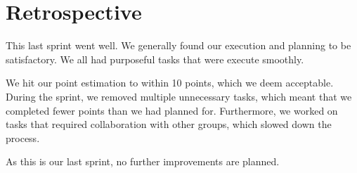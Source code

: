 \section{Retrospective}\label{sec:sprint6retrospective}
This last sprint went well. We generally found our execution and planning to be satisfactory. We all had purposeful tasks that were execute smoothly.

We hit our point estimation to within 10 points, which we deem acceptable. During the sprint, we removed multiple unnecessary tasks, which meant that we completed fewer points than we had planned for. Furthermore, we worked on tasks that required collaboration with other groups, which slowed down the process.

As this is our last sprint, no further improvements are planned.